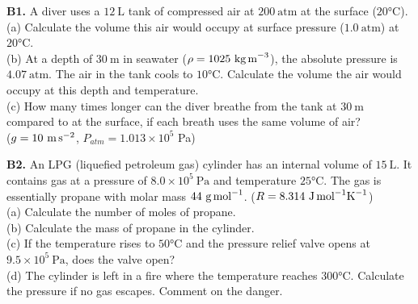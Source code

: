 \begin{exercisebox}[14]
\textbf{B1.} A diver uses a $12\ \text{L}$ tank of
compressed air at $200\ \text{atm}$ at the surface
($20°\text{C}$).\\[4pt]
(a) Calculate the volume this air would occupy at
surface pressure ($1.0\ \text{atm}$) at $20°\text{C}$.\\
(b) At a depth of $30\ \text{m}$ in seawater
($\rho = 1025\ \text{kg\,m}^{-3}$), the absolute
pressure is $4.07\ \text{atm}$. The air in the
tank cools to $10°\text{C}$. Calculate the volume
the air would occupy at this depth and temperature.\\
(c) How many times longer can the diver breathe
from the tank at $30\ \text{m}$ compared to at
the surface, if each breath uses the same volume
of air?\\
($g = 10\ \text{m\,s}^{-2}$, $P_{atm} = 1.013\times10^5$ Pa)
\hfill{}

\vspace{0.4cm}

\textbf{B2.} An LPG (liquefied petroleum gas)
cylinder has an internal volume of $15\ \text{L}$.
It contains gas at a pressure of $8.0\times10^5\ \text{Pa}$
and temperature $25°\text{C}$. The gas is essentially
propane with molar mass $44\ \text{g\,mol}^{-1}$.
($R = 8.314\ \text{J\,mol}^{-1}\text{K}^{-1}$)\\[4pt]
(a) Calculate the number of moles of propane.\\
(b) Calculate the mass of propane in the cylinder.\\
(c) If the temperature rises to $50°\text{C}$ and
the pressure relief valve opens at
$9.5\times10^5\ \text{Pa}$, does the valve open?\\
(d) The cylinder is left in a fire where the
temperature reaches $300°\text{C}$. Calculate the
pressure if no gas escapes. Comment on the danger.

\begin{center}
\end{center}
\hfill{}


\end{exercisebox}

